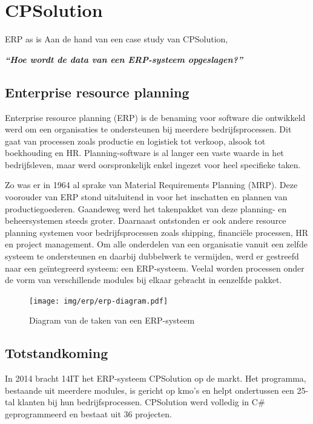 \chapter{CPSolution}
\label{ch:cpsolution}

ERP as is
Aan de hand van een case study van CPSolution, 

\begin{center}
	\textit{\textbf{``Hoe wordt de data van een ERP-systeem opgeslagen?''}}
\end{center}

\section{Enterprise resource planning}
\label{sec:enterprise-resource-planning}

Enterprise resource planning (ERP) is de benaming voor software die ontwikkeld werd om een organisaties te ondersteunen bij meerdere bedrijfsprocessen. Dit gaat van processen zoals productie en logistiek tot verkoop, alsook tot boekhouding en HR. Planning-software is al langer een vaste waarde in het bedrijfsleven, maar werd oorspronkelijk enkel ingezet voor heel specifieke taken. 

Zo was er in 1964 al sprake van Material Requirements Planning (MRP). Deze voorouder van ERP stond uitsluitend in voor het inschatten en plannen van productiegoederen. Gaandeweg werd het takenpakket van deze planning- en beheersystemen steeds groter. Daarnaast ontstonden er ook andere resource planning systemen voor bedrijfsprocessen zoals shipping, financiële processen, HR en project management. Om alle onderdelen van een organisatie vanuit een zelfde systeem te ondersteunen en daarbij dubbelwerk te vermijden, werd er gestreefd naar een geïntegreerd systeem: een ERP-systeem. Veelal worden processen onder de vorm van verschillende modules bij elkaar gebracht in eenzelfde pakket.

\begin{figure}[H]
	\centering
	\texttt{[image: img/erp/erp-diagram.pdf]}
	\caption{\label{fig:erp-diagram}Diagram van de taken van een ERP-systeem}
\end{figure}



\section{Totstandkoming}
\label{sec:totstandkoming}
In 2014 bracht 14IT het ERP-systeem CPSolution op de markt. Het programma, bestaande uit meerdere modules, is gericht op kmo's en helpt ondertussen een 25-tal klanten bij hun bedrijfsprocessen. CPSolution werd volledig in C\# geprogrammeerd en bestaat uit 36 projecten.

